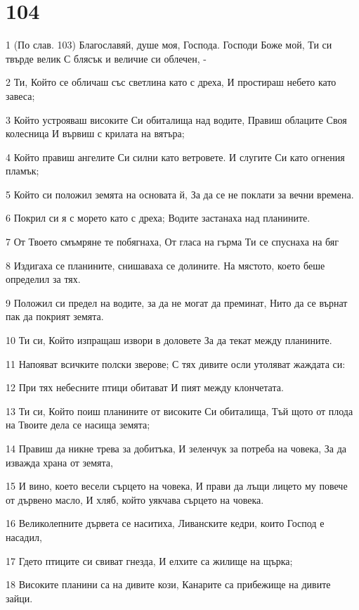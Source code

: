 \chapter{104}

\par 1 (По слав. 103) Благославяй, душе моя, Господа. Господи Боже мой, Ти си твърде велик С блясък и величие си облечен, -
\par 2 Ти, Който се обличаш със светлина като с дреха, И простираш небето като завеса;
\par 3 Който устрояваш високите Си обиталища над водите, Правиш облаците Своя колесница И вървиш с крилата на вятъра;
\par 4 Който правиш ангелите Си силни като ветровете. И слугите Си като огнения пламък;
\par 5 Който си положил земята на основата й, За да се не поклати за вечни времена.
\par 6 Покрил си я с морето като с дреха; Водите застанаха над планините.
\par 7 От Твоето смъмряне те побягнаха, От гласа на гърма Ти се спуснаха на бяг
\par 8 Издигаха се планините, снишаваха се долините. На мястото, което беше определил за тях.
\par 9 Положил си предел на водите, за да не могат да преминат, Нито да се върнат пак да покрият земята.
\par 10 Ти си, Който изпращаш извори в доловете За да текат между планините.
\par 11 Напояват всичките полски зверове; С тях дивите осли утоляват жаждата си:
\par 12 При тях небесните птици обитават И пият между клончетата.
\par 13 Ти си, Който поиш планините от високите Си обиталища, Тъй щото от плода на Твоите дела се насища земята;
\par 14 Правиш да никне трева за добитъка, И зеленчук за потреба на човека, За да изважда храна от земята,
\par 15 И вино, което весели сърцето на човека, И прави да лъщи лицето му повече от дървено масло, И хляб, който уякчава сърцето на човека.
\par 16 Великолепните дървета се наситиха, Ливанските кедри, които Господ е насадил,
\par 17 Гдето птиците си свиват гнезда, И елхите са жилище на щърка;
\par 18 Високите планини са на дивите кози, Канарите са прибежище на дивите зайци.
